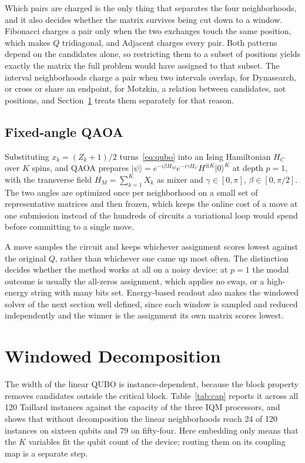 \documentclass[runningheads]{llncs}
\begin{document}
Which pairs are charged is the only thing that separates the four
neighborhoods, and it also decides whether the matrix survives being cut down to
a window. Fibonacci charges a pair only when the two exchanges
touch the same position, which makes $Q$ tridiagonal, and Adjacent charges
every pair. Both patterns depend on the candidates alone, so restricting them
to a subset of positions yields exactly the matrix the full problem would have
assigned to that subset. The interval neighborhoods charge a pair when two intervals overlap, for
Dynasearch, or cross or share an endpoint, for Motzkin, a relation between
candidates, not positions,
and Section~\ref{sec:windowed} treats them separately for that reason.

\subsection{Fixed-angle QAOA}
\label{subsec:qaoa}
Substituting $x_k = (Z_k + 1)/2$ turns~\eqref{eq:qubo} into an Ising
Hamiltonian $H_C$ over $K$ spins, and QAOA prepares
$\lvert \psi \rangle = e^{-i\beta H_M} e^{-i\gamma H_C} H^{\otimes K}
\lvert 0 \rangle^{K}$ at depth $p = 1$, with the transverse field
$H_M = \sum_{k=1}^{K} X_k$ as mixer and $\gamma \in [0, \pi]$,
$\beta \in [0, \pi/2]$. The two angles are optimized once per neighborhood on
a small set of representative matrices and then frozen, which keeps the online
cost of a move at one submission instead of the hundreds of circuits a
variational loop would spend before committing to a single move.

A move samples the circuit and keeps whichever assignment scores lowest
against the original $Q$, rather than whichever one came up most often. The
distinction decides whether the method works at all on a noisy device: at
$p = 1$ the modal outcome is usually the all-zeros assignment, which applies no
swap, or a high-energy string with many bits set. Energy-based readout also
makes the windowed solver of the next section well defined, since each window
is sampled and reduced independently and the winner is the assignment its own matrix scores lowest.

\section{Windowed Decomposition}
\label{sec:windowed}
The width of the linear QUBO is instance-dependent, because the block property removes candidates outside the critical block. Table~\ref{tab:cap}
reports it across all 120 Taillard instances against the capacity of the three
IQM processors, and shows that without decomposition the linear neighborhoods
reach 24 of 120 instances on sixteen qubits and 79 on fifty-four. Here embedding only means that the $K$ variables fit the qubit count of the
device; routing them on its coupling map is a separate step.
\end{document}
